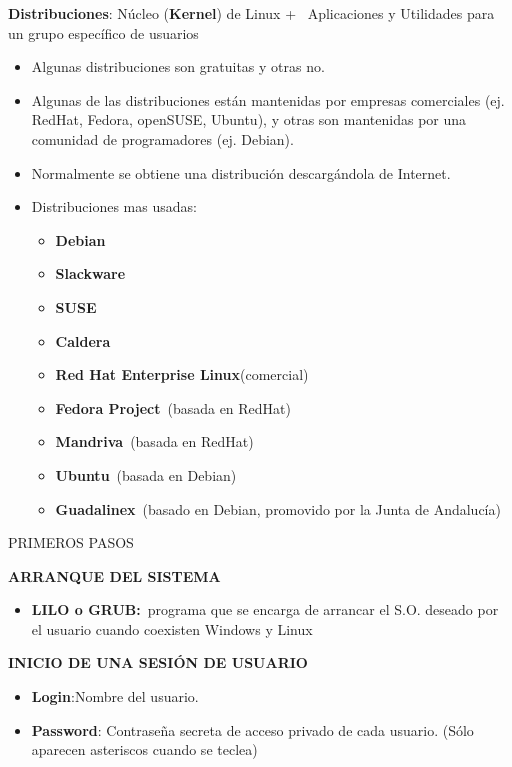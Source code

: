 \documentclass[
  jou,
  floatsintext,
  longtable,
  a4paper,
  nolmodern,
  notxfonts,
  notimes,
  12pt,
  colorlinks=true,linkcolor=blue,citecolor=blue,urlcolor=blue]{apa7}
\providecommand{\tightlist}{%
  \setlength{\itemsep}{0pt}\setlength{\parskip}{0pt}}
\begin{document}
\textbf{Distribuciones}: Núcleo (\textbf{Kernel}) de Linux +~
Aplicaciones y Utilidades para un grupo específico de usuarios

\begin{itemize}
\tightlist
\item
  Algunas distribuciones son gratuitas y otras no.
\item
  Algunas de las distribuciones están mantenidas por empresas
  comerciales (ej. RedHat, Fedora, openSUSE, Ubuntu), y otras son
  mantenidas por una comunidad de programadores (ej. Debian).
\item
  Normalmente se obtiene una distribución descargándola de Internet.
\item
  Distribuciones mas usadas:

  \begin{itemize}
  \tightlist
  \item
    \textbf{Debian}
  \item
    \textbf{Slackware}
  \item
    \textbf{SUSE}
  \item
    \textbf{Caldera}
  \item
    \textbf{Red Hat Enterprise Linux}(comercial)
  \item
    \textbf{Fedora Project}~(basada en RedHat)
  \item
    \textbf{Mandriva}~(basada en RedHat)
  \item
    \textbf{Ubuntu}~(basada en Debian)
  \item
    \textbf{Guadalinex}~(basado en Debian, promovido por la Junta de
    Andalucía)
  \end{itemize}
\end{itemize}

PRIMEROS PASOS

\textbf{ARRANQUE DEL SISTEMA}

\begin{itemize}
\tightlist
\item
  \textbf{LILO o GRUB:}~programa que se encarga de arrancar el S.O.
  deseado por el usuario cuando coexisten Windows y Linux
\end{itemize}

\textbf{INICIO DE UNA SESIÓN DE USUARIO}

\begin{itemize}
\tightlist
\item
  \textbf{Login}:Nombre del usuario.
\item
  \textbf{Password}: Contraseña secreta de acceso privado de cada
  usuario. (Sólo aparecen asteriscos cuando se teclea)
\end{itemize}
\end{document}
